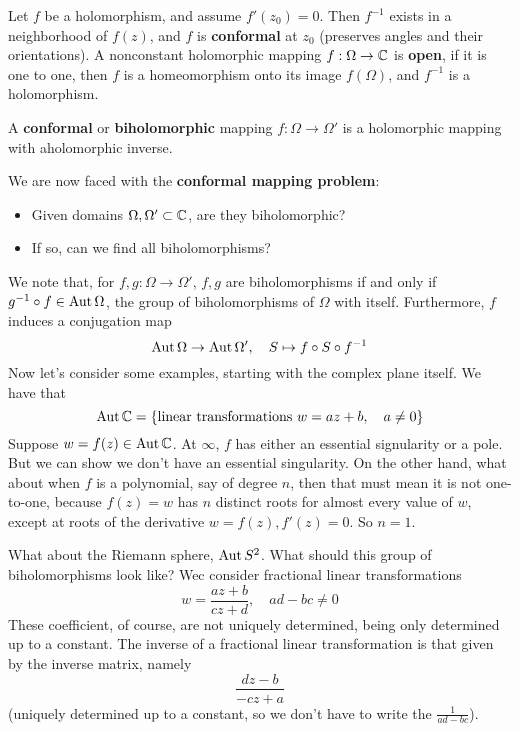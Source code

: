 \documentclass{article}
\begin{document}
Let \(f\) be a holomorphism, and assume \(f'(z_0) = 0\). Then \(f^{-1}\) exists in a neighborhood of \(f(z)\), and \(f\) is \textbf{conformal} at \(z_0\) (preserves angles and their orientations). A nonconstant holomorphic mapping \(f: \Omega \to \mathbb{C}\) is \textbf{open}, if it is one to one, then \(f\) is a homeomorphism onto its image \(f(\Omega)\), and \(f^{-1}\) is a holomorphism.
\begin{definition}
A \textbf{conformal} or \textbf{biholomorphic} mapping \(f: \Omega \to \Omega'\) is a holomorphic mapping with aholomorphic inverse.
\end{definition}
We are now faced with the \textbf{conformal mapping problem}:
\begin{itemize}

  \item Given domains \(\Omega, \Omega' \subset \mathbb{C}\), are they biholomorphic?

  \item If so, can we find all biholomorphisms?

\end{itemize}
We note that, for \(f, g: \Omega \to \Omega'\), \(f, g\) are biholomorphisms if and only if \(g^{-1} \circ f \in \operatorname{Aut}\Omega\), the group of biholomorphisms of \(\Omega\) with itself. Furthermore, \(f\) induces a conjugation map
\begin{equation}\operatorname{Aut}\Omega \to \operatorname{Aut}\Omega', \quad S \mapsto f \circ S \circ f^{-1}\end{equation}
Now let's consider some examples, starting with the complex plane itself. We have that
\begin{equation}\operatorname{Aut}\mathbb{C} = \{\text{linear transformations} \ w = az + b, \quad a \neq 0\}\end{equation}
Suppose \(w = f(z) \in \operatorname{Aut}\mathbb{C}\). At \(\infty\), \(f\) has either an essential signularity or a pole. But we can show we don't have an essential singularity. On the other hand, what about when \(f\) is a polynomial, say of degree \(n\), then that must mean it is not one-to-one, because
\(f(z) = w\) has \(n\) distinct roots for almost every value of \(w\), except at roots of the derivative \(w = f(z), f'(z) = 0\). So \(n = 1\).

What about the Riemann sphere, \(\operatorname{Aut} S^2\). What should this group of biholomorphisms look like? Wec consider fractional linear transformations
\begin{equation}w = \frac{az + b}{cz + d}, \quad ad - bc \neq 0\end{equation}
These coefficient, of course, are not uniquely determined, being only determined up to a constant. The inverse of a fractional linear transformation is that given by the inverse matrix, namely
\begin{equation}\frac{dz - b}{-cz + a}\end{equation}
(uniquely determined up to a constant, so we don't have to write the \(\frac{1}{ad - bc}\)).
\end{document}
